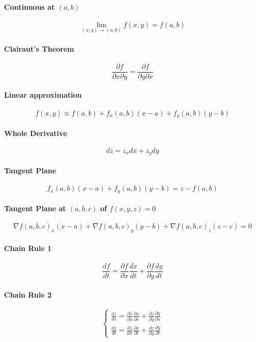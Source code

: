 \documentclass[12pt]{article}
\begin{document}
\paragraph{Continuous at $(a, b)$}
\[\lim_{(x, y)\rightarrow (a, b)} f(x, y) = f(a, b)\]

\paragraph{Clairaut's Theorem}
\[\frac{\partial f}{\partial x\partial y} = \frac{\partial f}{\partial y\partial x}\]
\paragraph{Linear approximation}
\[f(x, y) \approx f(a, b) + f_x(a, b)(x - a) + f_y(a, b)(y - b)\]

\paragraph{Whole Derivative}
\[dz = z_xdx + z_ydy\]

\paragraph{Tangent Plane}
\[f_x(a, b)(x - a) + f_y(a, b)(y - b) = z - f(a, b)\]

\paragraph{Tangent Plane at $(a, b, c)$ of $f(x, y, z) = 0$}
\[\nabla f(a, b, c)_x(x - a) + \nabla f(a, b, c)_y(y - b) + \nabla f(a, b, c)_z(z - c) = 0\]

\paragraph{Chain Rule 1}
\[\frac{df}{dt} = \frac{\partial f}{\partial x}\frac{dx}{dt} + \frac{\partial f}{\partial y}\frac{dy}{dt}\]

\paragraph{Chain Rule 2}
\[
	\begin{cases}
		\frac{dz}{ds} = \frac{\partial z}{\partial x}\frac{\partial x}{\partial s} + \frac{\partial z}{\partial y}\frac{\partial y}{\partial s}\\
		\frac{dz}{dt} = \frac{\partial z}{\partial x}\frac{\partial x}{\partial t} + \frac{\partial z}{\partial y}\frac{\partial y}{\partial t}
	\end{cases}
\]
	
\end{document}
